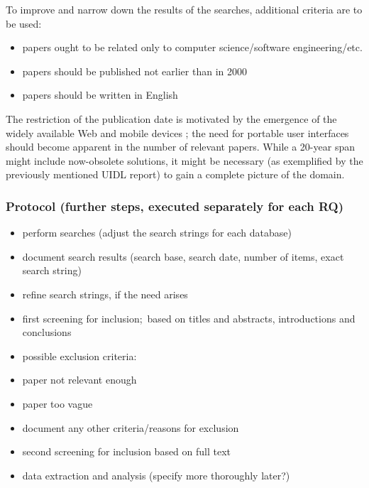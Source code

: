 To improve and narrow down the results of the searches, additional criteria are to be used:
\begin{itemize}
    \item papers ought to be related only to computer science/software engineering/etc.
    \item papers should be published not earlier than in 2000
    \item papers should be written in English
\end{itemize}

The restriction of the publication date is motivated by the emergence of the widely available Web and mobile devices ;
the need for portable user interfaces should become apparent in the number of relevant papers.
While a 20-year span might include now-obsolete solutions, it might be necessary
(as exemplified by the previously mentioned UIDL report) to gain a complete picture of the domain.

\subsubsection[Protocol]{Protocol (further steps, executed separately for each RQ)}
\begin{itemize}
    \item perform searches (adjust the search strings for each database)
    \item document search results (search base, search date, number of items, exact search string)
    \item refine search strings, if the need arises
    \item first screening for inclusion;\ based on titles and abstracts, introductions and conclusions
    \item possible exclusion criteria:
    \item paper not relevant enough
    \item paper too vague
    \item document any other criteria/reasons for exclusion
    \item second screening for inclusion based on full text
    \item data extraction and analysis (specify more thoroughly later?)
\end{itemize}
